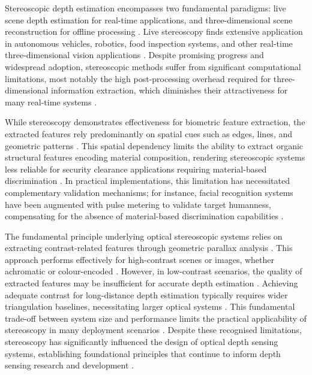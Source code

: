 \documentclass[12pt,a4paper,oneside]{report}
\begin{document}
Stereoscopic depth estimation encompasses two fundamental paradigms: live scene depth estimation for real-time applications, and three-dimensional scene reconstruction for offline processing \cite{laga2022}. Live stereoscopy finds extensive application in autonomous vehicles, robotics, food inspection systems, and other real-time three-dimensional vision applications \cite{laga2022,hu2020}. Despite promising progress and widespread adoption, stereoscopic methods suffer from significant computational limitations, most notably the high post-processing overhead required for three-dimensional information extraction, which diminishes their attractiveness for many real-time systems \cite{laga2022,bass2010}.

While stereoscopy demonstrates effectiveness for biometric feature extraction, the extracted features rely predominantly on spatial cues such as edges, lines, and geometric patterns \cite{hsu2024}. This spatial dependency limits the ability to extract organic structural features encoding material composition, rendering stereoscopic systems less reliable for security clearance applications requiring material-based discrimination \cite{sharan2013,schwartz2013}. In practical implementations, this limitation has necessitated complementary validation mechanisms; for instance, facial recognition systems have been augmented with pulse metering to validate target humanness, compensating for the absence of material-based discrimination capabilities \cite{hsu2024}.

The fundamental principle underlying optical stereoscopic systems relies on extracting contrast-related features through geometric parallax analysis \cite{bass2010,laga2022}. This approach performs effectively for high-contrast scenes or images, whether achromatic or colour-encoded \cite{bass2010}. However, in low-contrast scenarios, the quality of extracted features may be insufficient for accurate depth estimation \cite{laga2022}. Achieving adequate contrast for long-distance depth estimation typically requires wider triangulation baselines, necessitating larger optical systems \cite{laga2022}. This fundamental trade-off between system size and performance limits the practical applicability of stereoscopy in many deployment scenarios \cite{bass2010,laga2022}. Despite these recognised limitations, stereoscopy has significantly influenced the design of optical depth sensing systems, establishing foundational principles that continue to inform depth sensing research and development \cite{laga2022,wheatstone1838}.
\end{document}
